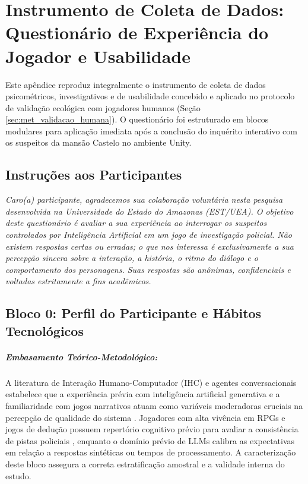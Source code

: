 \chapter{Instrumento de Coleta de Dados: Questionário de Experiência do Jogador e Usabilidade}
\label{apendice:questionario_jogadores}

Este apêndice reproduz integralmente o instrumento de coleta de dados psicométricos, investigativos e de usabilidade concebido e aplicado no protocolo de validação ecológica com jogadores humanos (Seção \ref{sec:met_validacao_humana}). O questionário foi estruturado em blocos modulares para aplicação imediata após a conclusão do inquérito interativo com os suspeitos da mansão Castelo no ambiente Unity.

\section*{Instruções aos Participantes}
\textit{Caro(a) participante, agradecemos sua colaboração voluntária nesta pesquisa desenvolvida na Universidade do Estado do Amazonas (EST/UEA). O objetivo deste questionário é avaliar a sua experiência ao interrogar os suspeitos controlados por Inteligência Artificial em um jogo de investigação policial. Não existem respostas certas ou erradas; o que nos interessa é exclusivamente a sua percepção sincera sobre a interação, a história, o ritmo do diálogo e o comportamento dos personagens. Suas respostas são anônimas, confidenciais e voltadas estritamente a fins acadêmicos.}

\vspace{0.05cm}

\section{Bloco 0: Perfil do Participante e Hábitos Tecnológicos}
\label{sec:apendice_d_bloco0}

\paragraph*{Embasamento Teórico-Metodológico:} A literatura de Interação Humano-Computador (IHC) e agentes conversacionais estabelece que a experiência prévia com inteligência artificial generativa e a familiaridade com jogos narrativos atuam como variáveis moderadoras cruciais na percepção de qualidade do sistema \cite{gnewuch2018faster,nass2000machines}. Jogadores com alta vivência em RPGs e jogos de dedução possuem repertório cognitivo prévio para avaliar a consistência de pistas policiais \cite{fernandez2014introduction}, enquanto o domínio prévio de LLMs calibra as expectativas em relação a respostas sintéticas ou tempos de processamento. A caracterização deste bloco assegura a correta estratificação amostral e a validade interna do estudo.

